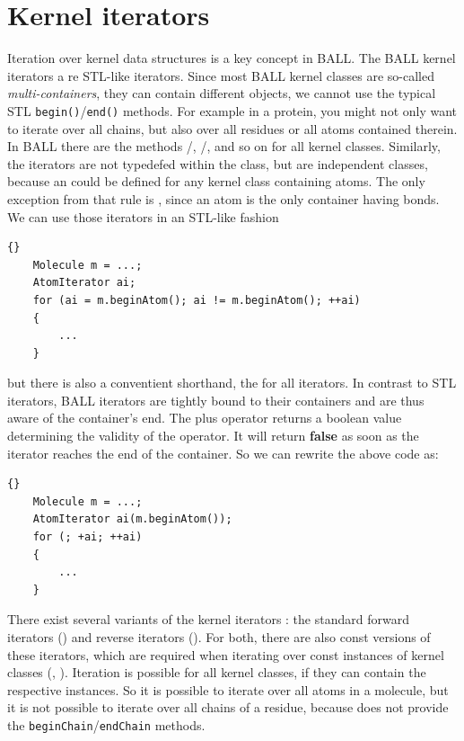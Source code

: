 {\section{Kernel iterators}
Iteration over kernel data structures is a key concept in BALL.
The BALL kernel iterators a re STL-like iterators. Since most BALL kernel
classes are so-called {\em multi-containers}, \ie they can contain different
objects, we cannot use the typical STL {\tt begin()}/{\tt end()} methods.
For example in a protein, you might not only want to iterate over all chains,
but also over all residues or all atoms contained therein. In BALL there
are the methods /,
/, and so on for all
kernel classes. Similarly, the iterators are not typedefed within the class,
but are independent classes, because an  could be defined
for any kernel class containing atoms. The only exception from that rule
is , since an atom is the only container having
bonds. We can use those iterators in an STL-like fashion
\\
\begin{lstlisting}{}
	Molecule m = ...;
	AtomIterator ai;
	for (ai = m.beginAtom(); ai != m.beginAtom(); ++ai)
	{
		...
	}
\end{lstlisting}
\noindent but there is also a conventient shorthand, the 
for all iterators. In contrast to STL iterators, BALL iterators are tightly 
bound to their containers and are thus aware of the container's end.
The plus operator returns a boolean value determining the validity of the
operator. It will return {\bf false} as soon as the iterator reaches the
end of the container. So we can rewrite the above code as:
\\
\begin{lstlisting}{}
	Molecule m = ...;
	AtomIterator ai(m.beginAtom());
	for (; +ai; ++ai)
	{
		...
	}
\end{lstlisting}
\noindent There exist several variants of the kernel iterators : the standard
forward iterators (\eg {}) and reverse iterators
(). For both, there are also const versions of
these iterators, which are required when iterating over const instances of
kernel classes (, ).
Iteration is possible for all kernel classes, if they can contain the
respective instances. So it is possible to iterate over all atoms in a
molecule, but it is not possible to iterate over all chains of a residue,
because  does not provide the {\tt beginChain}/{\tt endChain}
methods.

}
